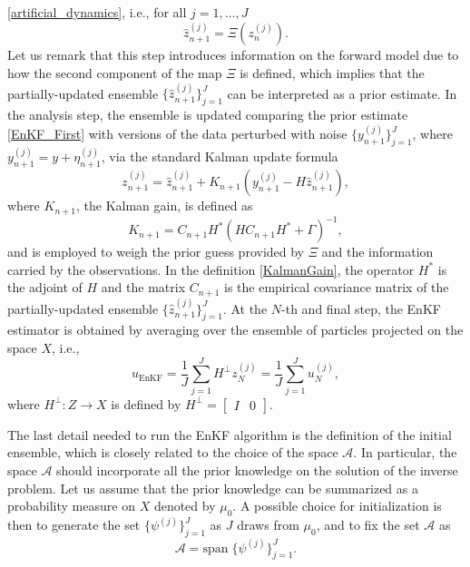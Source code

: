 \eqref{artificial_dynamics}, i.e., for all $j = 1, \ldots, J$
\begin{equation}\label{EnKF_First}
	\hat{z}_{n+1}^{(j)} = \Xi(z_n^{(j)}).
\end{equation}
Let us remark that this step introduces information on the forward model due to how the second component of the map $\Xi$ is defined, which implies that the partially-updated ensemble $\{\hat z_{n+1}^{(j)} \}_{j=1}^J$ can be interpreted as a prior estimate. In the analysis step, the ensemble is updated comparing the prior estimate \eqref{EnKF_First} with versions of the data perturbed with noise $\{ y_{n+1}^{(j)} \}_{j=1}^J$, where $y_{n+1}^{(j)} = y + \eta_{n+1}^{(j)}$, via the standard Kalman update formula
\begin{equation}\label{KalmanUpdate}
	z_{n+1}^{(j)} = \hat{z}_{n+1}^{(j)} + K_{n+1} (y_{n+1}^{(j)} - H \hat{z}_{n+1}^{(j)}),
\end{equation}
where $K_{n+1}$, the Kalman gain, is defined as
\begin{equation}\label{KalmanGain}
	K_{n+1} = C_{n+1} H^* (H C_{n+1} H^* + \Gamma)^{-1},
\end{equation}
and is employed to weigh the prior guess provided by $\Xi$ and the information carried by the observations. In the definition \eqref{KalmanGain}, the operator $H^*$ is the adjoint of $H$ and the matrix $C_{n+1}$ is the empirical covariance matrix of the partially-updated ensemble $\{\hat z_{n+1}^{(j)} \}_{j=1}^J$. At the $N$-th and final step, the EnKF estimator is obtained by averaging over the ensemble of particles projected on the space $X$, i.e.,
\begin{equation*}
	u_{\mathrm{EnKF}} = \frac{1}{J} \sum_{j = 1}^J H^{\perp} z_{N}^{(j)} = \frac{1}{J} \sum_{j = 1}^J u_{N}^{(j)},
\end{equation*}
where $H^{\perp} \colon Z \to X$ is defined by $H^{\perp} = \begin{bmatrix} I & 0 \end{bmatrix}$.

The last detail needed to run the EnKF algorithm is the definition of the initial ensemble, which is closely related to the choice of the space $\mathcal{A}$. In particular, the space $\mathcal A$ should incorporate all the prior knowledge on the solution of the inverse problem. Let us assume that the prior knowledge can be summarized as a probability measure on $X$ denoted by $\mu_0$. A possible choice for initialization is then to generate the set $\{ \psi^{(j)} \}_{j = 1}^J$ as $J$ draws from $\mu_0$, and to fix the set $\mathcal{A}$ as
\[ \mathcal{A} = \mathrm{span} \; \{\psi^{(j)} \}_{j=1}^J. \]

